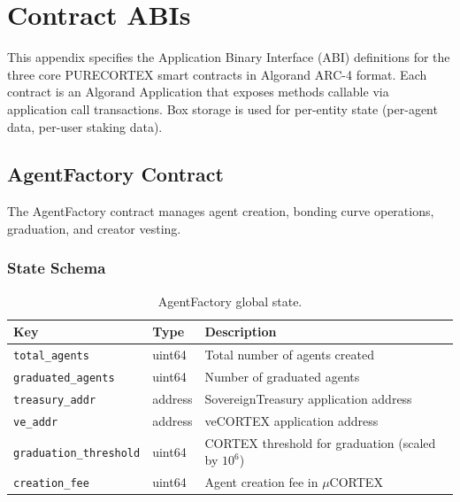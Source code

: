 \section{Contract ABIs}
\label{app:contracts}

This appendix specifies the Application Binary Interface (ABI) definitions for
the three core PURECORTEX smart contracts in Algorand ARC-4 format. Each
contract is an Algorand Application that exposes methods callable via
application call transactions. Box storage is used for per-entity state
(per-agent data, per-user staking data).

\subsection{AgentFactory Contract}
\label{subsec:abi-factory}

The AgentFactory contract manages agent creation, bonding curve operations,
graduation, and creator vesting.

\subsubsection{State Schema}

\begin{table}[H]
\centering
\caption{AgentFactory global state.}
\label{tab:factory-global}
\begin{tabular}{@{}llp{6cm}@{}}
\toprule
\textbf{Key} & \textbf{Type} & \textbf{Description} \\
\midrule
\texttt{total\_agents} & uint64 & Total number of agents created \\
\texttt{graduated\_agents} & uint64 & Number of graduated agents \\
\texttt{treasury\_addr} & address & SovereignTreasury application address \\
\texttt{ve\_addr} & address & veCORTEX application address \\
\texttt{graduation\_threshold} & uint64 & CORTEX threshold for graduation (scaled by $10^6$) \\
\texttt{creation\_fee} & uint64 & Agent creation fee in $\mu$CORTEX \\
\bottomrule
\end{tabular}
\end{table}

